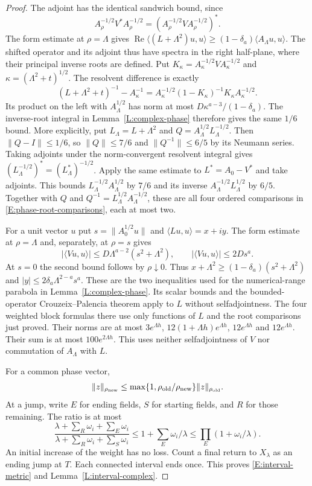 \documentclass[12pt]{article}
\numberwithin{equation}{section}
\theoremstyle{definition}
\begin{document}
\begin{proof}
  The adjoint has the identical sandwich bound, since
  \[
    A_\rho^{-1/2}V^*A_\rho^{-1/2}
    =(A_\rho^{-1/2}VA_\rho^{-1/2})^*.
  \]
  The form estimate at $\rho=\Lambda$ gives
  $\operatorname{Re}\langle(L+\Lambda^2)u,u\rangle
  \ge(1-\delta_a)\langle A_\Lambda u,u\rangle$.
  The shifted operator and its adjoint thus have spectra in the right
  half-plane, where their principal inverse roots are defined.
  Put $K_\kappa=A_\kappa^{-1/2}VA_\kappa^{-1/2}$ and
  $\kappa=(\Lambda^2+t)^{1/2}$. The resolvent difference is exactly
  \[
    (L+\Lambda^2+t)^{-1}-A_\kappa^{-1}
    =A_\kappa^{-1/2}(1-K_\kappa)^{-1}K_\kappa A_\kappa^{-1/2}.
  \]
  Its product on the left with $A_\Lambda^{1/2}$ has norm at most
  $D\kappa^{a-3}/(1-\delta_a)$. The inverse-root integral in
  Lemma~\ref{L:complex-phase} therefore gives the same $1/6$ bound.
  More explicitly, put $L_\Lambda=L+\Lambda^2$ and
  $Q=A_\Lambda^{1/2}L_\Lambda^{-1/2}$. Then
  $\|Q-I\|\le1/6$, so $\|Q\|\le7/6$ and
  $\|Q^{-1}\|\le6/5$ by its Neumann series.
  Taking adjoints under the norm-convergent resolvent integral gives
  $(L_\Lambda^{-1/2})^*=(L_\Lambda^*)^{-1/2}$.
  Apply the same estimate to $L^*=A_0-V^*$ and take adjoints.
  This bounds $L_\Lambda^{-1/2}A_\Lambda^{1/2}$ by $7/6$ and its
  inverse $A_\Lambda^{-1/2}L_\Lambda^{1/2}$ by $6/5$.
  Together with $Q$ and $Q^{-1}=L_\Lambda^{1/2}A_\Lambda^{-1/2}$,
  these are all four ordered comparisons in
  \eqref{E:phase-root-comparisons}, each at most two.

  For a unit vector $u$ put $s=\|A_0^{1/2}u\|$ and
  $\langle Lu,u\rangle=x+iy$. The form estimate at $\rho=\Lambda$
  and, separately, at $\rho=s$ gives
  \[
    |\langle Vu,u\rangle|\le D\Lambda^{a-2}(s^2+\Lambda^2),
    \qquad |\langle Vu,u\rangle|\le2Ds^a.
  \]
  At $s=0$ the second bound follows by $\rho\downarrow0$.
  Thus $x+\Lambda^2\ge(1-\delta_a)(s^2+\Lambda^2)$ and
  $|y|\le2\delta_a\Lambda^{2-a}s^a$. These are the two inequalities
  used for the numerical-range parabola in Lemma~\ref{L:complex-phase}.
  Its scalar bounds and the bounded-operator Crouzeix--Palencia theorem
  apply to $L$ without selfadjointness. The four weighted block formulas
  there use only functions of $L$ and the root comparisons just proved.
  Their norms are at most $3e^{\Lambda h}$,
  $12(1+\Lambda h)e^{\Lambda h}$, $12e^{\Lambda h}$ and
  $12e^{\Lambda h}$. Their sum is at most $100e^{2\Lambda h}$.
  This uses neither selfadjointness of $V$ nor commutation of
  $A_\Lambda$ with $L$.

  For a common phase vector,
  \[
    \|z\|_{\rho_{\rm new}}
    \le\max\{1,\rho_{\rm old}/\rho_{\rm new}\}\|z\|_{\rho_{\rm old}}.
  \]
  At a jump, write $E$ for ending fields, $S$ for starting fields,
  and $R$ for those remaining. The ratio is at most
  \[
    \frac{\lambda+\sum_R\omega_i+\sum_E\omega_i}
    {\lambda+\sum_R\omega_i+\sum_S\omega_i}
    \le1+\sum_E\omega_i/\lambda
    \le\prod_E(1+\omega_i/\lambda).
  \]
  An initial increase of the weight has no loss. Count a final return
  to $X_\lambda$ as an ending jump at $T$.
  Each connected interval ends once. This proves
  \eqref{E:interval-metric} and Lemma~\ref{L:interval-complex}.
\end{proof}
\end{document}
